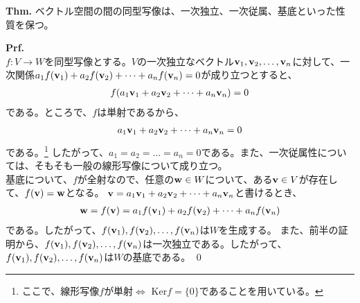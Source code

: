 \documentclass[a4paper,11pt]{jsarticle}
\numberwithin{equation}{section}
\begin{document}
\begin{itembox}[l]{\textbf{Thm.}}
  ベクトル空間の間の同型写像は、一次独立、一次従属、基底といった性質を保つ。
\end{itembox}
\textbf{Prf.}\\
$f:V \to W$を同型写像とする。$V$の一次独立なベクトル$\vb{v}_1, \vb{v}_2, \dots, \vb{v}_n$に対して、一次関係$a_1f(\vb{v}_1) + a_2f(\vb{v}_2) + \dots + a_nf(\vb{v}_n) = 0$が成り立つとすると、
\begin{align}
  f(a_1\vb{v}_1 + a_2\vb{v}_2 + \dots + a_n\vb{v}_n) = 0
\end{align}
である。ところで、$f$は単射であるから、
\begin{align}
  a_1\vb{v}_1 + a_2\vb{v}_2 + \dots + a_n\vb{v}_n = 0
\end{align}
である。\footnote{
  ここで、線形写像$f$が単射$\Leftrightarrow$ Ker$f = \{0\}$であることを用いている。
}
したがって、$a_1 = a_2 = \dots = a_n = 0$である。また、一次従属性については、そもそも一般の線形写像について成り立つ。\\
基底について、$f$が全射なので、任意の$\vb{w} \in W$について、ある$\vb{v} \in V$が存在して、$f(\vb{v}) = \vb{w}$となる。
$\vb{v} = a_1\vb{v}_1 + a_2\vb{v}_2 + \dots + a_n\vb{v}_n$と書けるとき、
\begin{align}
  \vb{w} = f(\vb{v}) = a_1f(\vb{v}_1) + a_2f(\vb{v}_2) + \dots + a_nf(\vb{v}_n)
\end{align}
である。したがって、$f(\vb{v}_1), f(\vb{v}_2), \dots, f(\vb{v}_n)$は$W$を生成する。
また、前半の証明から、$f(\vb{v}_1), f(\vb{v}_2), \dots, f(\vb{v}_n)$は一次独立である。したがって、$f(\vb{v}_1), f(\vb{v}_2), \dots, f(\vb{v}_n)$は$W$の基底である。
\qed
\end{document}
